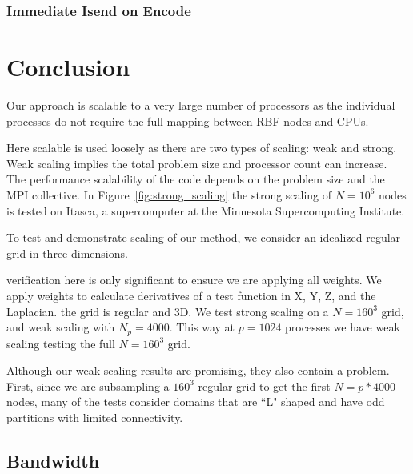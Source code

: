 \documentclass{report}
\begin{document}
\subsubsection{Immediate Isend on Encode}





\section{Conclusion}

      Our approach is scalable to a very large number of 
		processors as the individual processes do not require the 
		full mapping between RBF nodes and CPUs. 
		
Here scalable is used loosely as there are two types of scaling: weak and strong. Weak scaling implies the total problem size and processor count can increase. The performance scalability of the code depends on the problem size and the MPI collective. In Figure~\ref{fig:strong_scaling} the strong scaling of $N=10^6$ nodes is tested on Itasca, a supercomputer at the Minnesota Supercomputing Institute.   


To test and demonstrate scaling of our method, we consider an idealized regular grid in three dimensions. 

verification here is only significant to ensure we are applying all weights. 
We apply weights to calculate derivatives of a test function in X, Y, Z, and the Laplacian. 
the grid is regular and 3D.
We test strong scaling on a $N=160^3$ grid, and weak scaling with $N_p=4000$. This way at $p=1024$ processes we have weak scaling testing the full $N=160^3$ grid. 


Although our weak scaling results are promising, they also contain a problem. First, since we are subsampling a $160^3$ regular grid to get the first $N=p*4000$ nodes, many of the tests consider domains that are ``L" shaped and have odd partitions with limited connectivity.



\subsection{Bandwidth}
\end{document}
